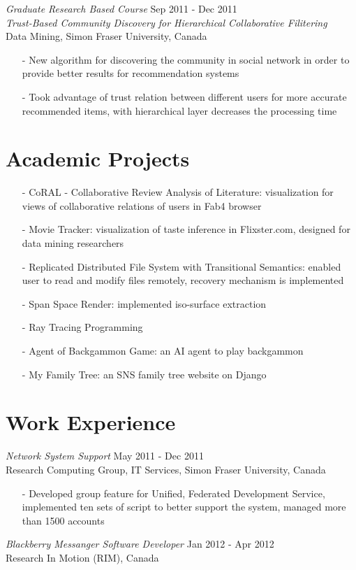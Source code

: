 \documentclass[line,margin]{res}
\begin{document}
\begin{resume}
	{\sl Graduate Research Based Course} \hfill Sep 2011 - Dec 2011 \\
    {\sl Trust-Based Community Discovery for Hierarchical Collaborative Filitering} \\
	Data Mining, Simon Fraser University, Canada
	\begin{itemize} \itemsep -2pt
	    \item[-] New algorithm for discovering the community in social network in order to provide better results for recommendation systems
		\item[-] Took advantage of trust relation between different users for more accurate recommended items, with hierarchical layer decreases the processing time
	\end{itemize}

    
\section{Academic Projects}
    \begin{itemize} \itemsep -2pt 
	  \setlength{\itemindent}{-1.5em}
	    \item[-] CoRAL - Collaborative Review Analysis of Literature: visualization for views of collaborative relations of users in Fab4 browser
        \item[-] Movie Tracker: visualization of taste inference in Flixster.com, designed for data mining researchers
        \item[-] Replicated Distributed File System with Transitional Semantics: enabled user to read and modify files remotely, recovery mechanism is implemented
        \item[-] Span Space Render: implemented iso-surface extraction 
		\item[-] Ray Tracing Programming
		\item[-] Agent of Backgammon Game: an AI agent to play backgammon
		\item[-] My Family Tree: an SNS family tree website on Django
	\end{itemize}

\section {Work Experience}
    {\sl Network System Support} \hfill May 2011 - Dec 2011 \\
	Research Computing Group, IT Services, Simon Fraser University, Canada 
	\begin{itemize} \itemsep -2pt
	    \item[-] Developed group feature for Unified, Federated Development Service, implemented ten sets of script to better support the system, managed more than 1500 accounts
	\end{itemize}
	\vspace{-1.3em}
	{\sl Blackberry Messanger Software Developer} \hfill Jan 2012 - Apr 2012\\
	Research In Motion (RIM), Canada


\end{resume}
\end{document}
